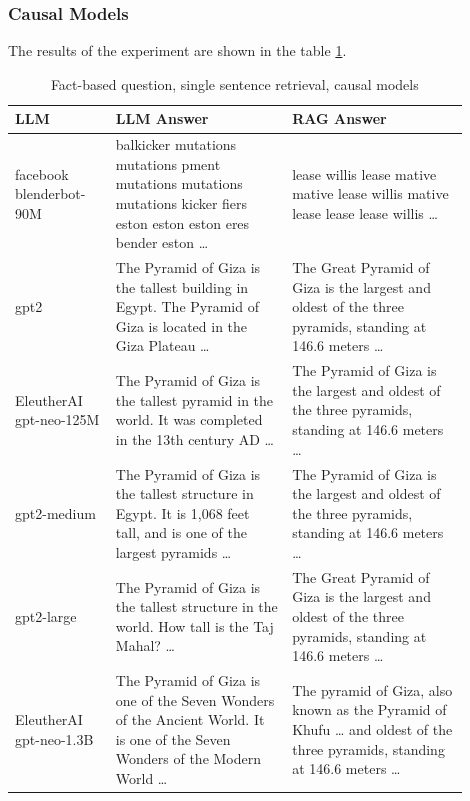 \documentclass{wseas}
\begin{document}
\subsubsection{Causal Models}

The results of the experiment are shown in the table \ref{tab:experiment_R_1_sentence_Q_fact_M_casual_table}.
\begin{table}[htbp]
  \centering
  \caption{Fact-based question, single sentence retrieval, causal models} %
  \label{tab:experiment_R_1_sentence_Q_fact_M_casual_table}  %
    \begin{tabular}{|p{0.20\linewidth}|p{0.35\linewidth}|p{0.35\linewidth}|}
      \hline
      \textbf{LLM} & \textbf{LLM Answer} & \textbf{RAG Answer} \\ \hline
      facebook blenderbot-90M & balkicker mutations mutations pment mutations mutations mutations kicker fiers eston eston eston eres bender eston \ldots{} & lease willis lease mative mative lease willis mative lease lease lease willis \ldots{} \\ \hline
      gpt2 & The Pyramid of Giza is the tallest building in Egypt. The Pyramid of Giza is located in the Giza Plateau \ldots{} & The Great Pyramid of Giza is the largest and oldest of the three pyramids, standing at 146.6 meters \ldots{} \\ \hline
      EleutherAI gpt-neo-125M & The Pyramid of Giza is the tallest pyramid in the world. It was completed in the 13th century AD \ldots{} & The Pyramid of Giza is the largest and oldest of the three pyramids, standing at 146.6 meters \ldots{} \\ \hline
      gpt2-medium & The Pyramid of Giza is the tallest structure in Egypt. It is 1,068 feet tall, and is one of the largest pyramids \ldots{} & The Pyramid of Giza is the largest and oldest of the three pyramids, standing at 146.6 meters \ldots{} \\ \hline
      gpt2-large & The Pyramid of Giza is the tallest structure in the world. How tall is the Taj Mahal? \ldots{} & The Great Pyramid of Giza is the largest and oldest of the three pyramids, standing at 146.6 meters \ldots{} \\ \hline
      EleutherAI gpt-neo-1.3B & The Pyramid of Giza is one of the Seven Wonders of the Ancient World. It is one of the Seven Wonders of the Modern World \ldots{} & The pyramid of Giza, also known as the Pyramid of Khufu \ldots{} and oldest of the three pyramids, standing at 146.6 meters \ldots{} \\ \hline
    \end{tabular}
\end{table}
\end{document}
